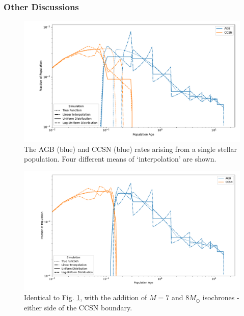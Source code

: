 \documentclass[a4paper,11pt]{article}
\begin{document}
\begin{aside}
				\subsubsection{Other Discussions}

					

			\end{aside}
			\begin{figure}
				\begin{center}
					\includegraphics[width=\linewidth,height=0.4\paperheight,keepaspectratio=true]{interp_multismooth.pdf}
					\captionsetup{singlelinecheck=off}
					\caption[foo]{The AGB (blue) and CCSN (blue) rates arising from a single stellar population. Four different means of `interpolation' are shown.
					}\label{F:Multismooth}
					\end{center}
			\end{figure}
			\begin{figure}
				\begin{center}
					\includegraphics[width=\linewidth,height=0.4\paperheight,keepaspectratio=true]{interp_ccsnBracket.pdf}
					\captionsetup{singlelinecheck=off}
					\caption[foo]{Identical to Fig. \ref{F:Multismooth}, with the addition of $M = 7$ and $8M_\odot$ isochrones - either side of the CCSN boundary.}\label{F:CCSN_Bracket}
					\end{center}
			\end{figure}
\end{document}

